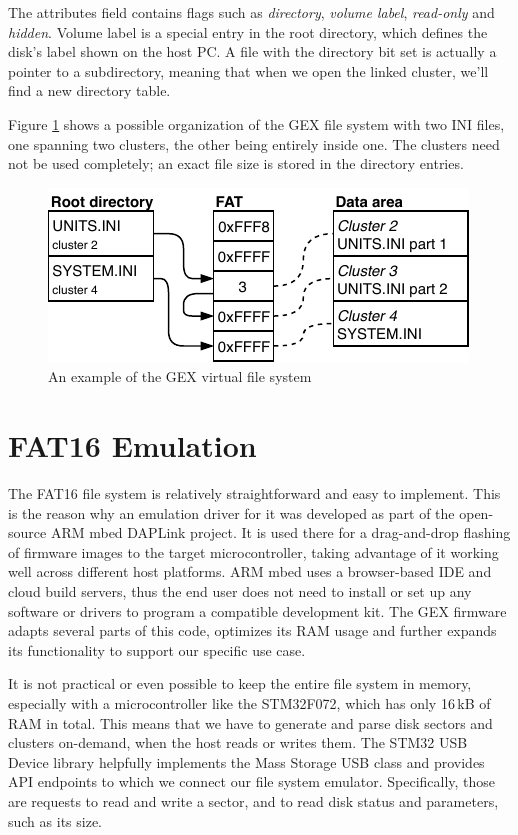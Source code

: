 The attributes field contains flags such as \textit{directory}, \textit{volume label}, \textit{read-only} and \textit{hidden}. Volume label is a special entry in the root directory, which defines the disk's label shown on the host PC. A file with the directory bit set is actually a pointer to a subdirectory, meaning that when we open the linked cluster, we'll find a new directory table.

Figure \ref{fig:fat-example} shows a possible organization of the GEX file system with two INI files, one spanning two clusters, the other being entirely inside one. The clusters need not be used completely; an exact file size is stored in the directory entries.

\begin{figure}[h]
	\centering
	\includegraphics[scale=1.3] {img/fat-links.pdf}
	\caption{\label{fig:fat-example}An example of the GEX virtual file system}
\end{figure}


\section{FAT16 Emulation}

The FAT16 file system is relatively straightforward and easy to implement. This is the reason why an emulation driver for it was developed as part of the open-source ARM mbed DAPLink project.  It is used there for a drag-and-drop flashing of firmware images to the target microcontroller, taking advantage of it working well across different host platforms. ARM mbed uses a browser-based IDE and cloud build servers, thus the end user does not need to install or set up any software or drivers to program a compatible development kit. The GEX firmware adapts several parts of this code, optimizes its RAM usage and further expands its functionality to support our specific use case.

It is not practical or even possible to keep the entire file system in memory, especially with a microcontroller like the STM32F072, which has only 16\,kB of RAM in total. This means that we have to generate and parse disk sectors and clusters on-demand, when the host reads or writes them. The STM32 USB Device library helpfully implements the Mass Storage USB class and provides API endpoints to which we connect our file system emulator. Specifically, those are requests to read and write a sector, and to read disk status and parameters, such as its size.

